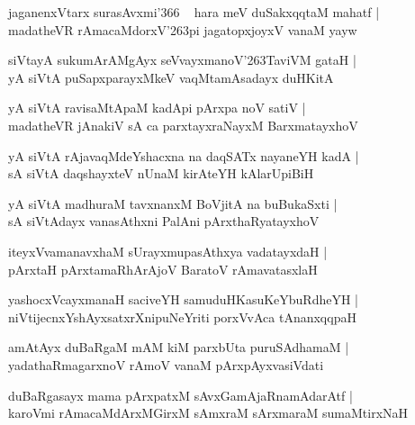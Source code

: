 \documentclass[twoside,12pt,openright]{book}
\def\S{\char'263}
\newcounter{shloka}[chapter]
\begin{document}
\begin{shloka}%
jaganenxVtarx surasAvxmi\char'366 ~ hara meV duSakxqqtaM mahatf |\\
madatheVR rAmacaMdorxV\S pi jagatopxjoyxV vanaM yayw 
\end{shloka}

\begin{shloka}%
siVtayA sukumArAMgAyx seVvayxmanoV\S TaviVM gataH |\\
yA siVtA puSapxparayxMkeV vaqMtamAsadayx duHKitA 
\end{shloka}

\begin{shloka}%
yA siVtA ravisaMtApaM kadApi pArxpa noV satiV |\\
madatheVR jAnakiV sA ca parxtayxraNayxM BarxmatayxhoV 
\end{shloka}

\begin{shloka}%
yA siVtA rAjavaqMdeYshacxna na daqSATx nayaneYH kadA |\\
sA siVtA daqshayxteV nUnaM kirAteYH kAlarUpiBiH
\end{shloka}

\begin{shloka}%
yA siVtA madhuraM tavxnanxM BoVjitA na buBukaSxti |\\
sA siVtAdayx vanasAthxni PalAni pArxthaRyatayxhoV
\end{shloka}

\begin{shloka}%
iteyxVvamanavxhaM sUrayxmupasAthxya vadatayxdaH |\\
pArxtaH pArxtamaRhArAjoV BaratoV rAmavatasxlaH
\end{shloka}

\begin{shloka}%
yashocxVcayxmanaH saciveYH samuduHKasuKeYbuRdheYH |\\
niVtijecnxYshAyxsatxrXnipuNeYriti porxVvAca tAnanxqqpaH
\end{shloka}

\begin{shloka}%
amAtAyx duBaRgaM mAM kiM parxbUta puruSAdhamaM |\\
yadathaRmagarxnoV rAmoV vanaM pArxpAyxvasiVdati
\end{shloka}

\begin{shloka}%
duBaRgasayx mama pArxpatxM sAvxGamAjaRnamAdarAtf |\\
karoVmi rAmacaMdArxMGirxM sAmxraM sArxmaraM sumaMtirxNaH
\end{shloka}
\end{document}
